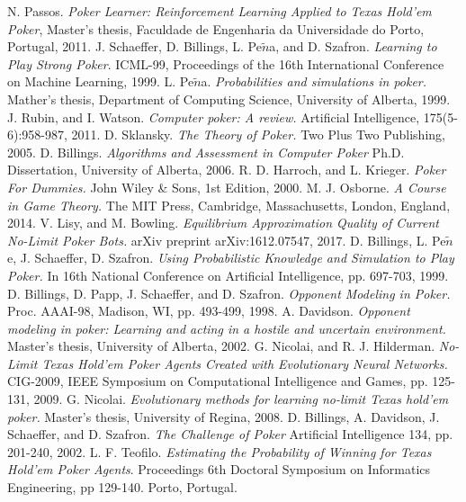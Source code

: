 
\begin{thebibliography}{9}
  N. Passos.
  \textit{Poker Learner: Reinforcement Learning Applied to Texas Hold'em Poker},
  Master's thesis, Faculdade de Engenharia da Universidade do Porto, Portugal, 
  2011.
  \href{https://paginas.fe.up.pt/$\sim$ei08029/Master\%20Thesis\%20-\%20Nuno\%20Passos.pdf}{}
   J. Schaeffer, D. Billings, L. Pe$\tilde{n}$a, and D. Szafron.
  \textit{Learning to Play Strong Poker}.
  ICML-99, Proceedings of the 16th International Conference on Machine Learning, 
  1999.
  \href{http://poker.cs.ualberta.ca/publications/ICML99.pdf}{}
  L. Pe$\tilde{n}$a.
  \textit{Probabilities and simulations in poker.}
  Mather's thesis, Department of Computing Science, University of Alberta,
  1999.
  J. Rubin, and I. Watson.
  \textit{Computer poker: A review.}
   Artificial Intelligence, 175(5-6):958-987,
  2011.
  D. Sklansky.
  \textit{The Theory of Poker.}
   Two Plus Two Publishing,
  2005.
  D. Billings.
  \textit{Algorithms and Assessment in Computer Poker}
   Ph.D. Dissertation, University of Alberta,
  2006.
  R. D. Harroch, and L. Krieger.
  \textit{Poker For Dummies.}
   John Wiley \& Sons, 1st Edition,
  2000.
  M. J. Osborne.
  \textit{A Course in Game Theory.}
   The MIT Press, Cambridge, Massachusetts, London, England,
  2014.
  V. Lisy, and M. Bowling.
  \textit{Equilibrium Approximation Quality of Current No-Limit Poker Bots.}
   arXiv preprint arXiv:1612.07547,
  2017.
  D. Billings, L. Pe$\tilde{n}$e, J. Schaeffer, D. Szafron.
  \textit{Using Probabilistic Knowledge and Simulation to Play Poker.}
   In 16th National Conference on Artificial
Intelligence, pp. 697-703,
  1999.
  D. Billings, D. Papp, J. Schaeffer, and D. Szafron.
  \textit{Opponent Modeling in Poker.}
   Proc. AAAI-98, Madison, WI, pp. 493-499,
  1998.
  A. Davidson.
  \textit{Opponent modeling in poker: Learning and acting in a hostile and uncertain environment.}
   Master’s thesis, University of Alberta, 
  2002.
G. Nicolai, and R. J. Hilderman.
\textit{No-Limit Texas Hold'em Poker Agents Created with Evolutionary Neural Networks.}
CIG-2009, IEEE Symposium on Computational Intelligence and Games, pp. 125-131, 2009.
G. Nicolai.
\textit{Evolutionary methods for learning no-limit Texas hold'em poker.} Master's thesis, University of Regina, 2008.
D. Billings, A. Davidson, J. Schaeffer, and D. Szafron.
\textit{The Challenge of Poker}
Artificial Intelligence 134, pp. 201-240, 2002.
L. F. Teofilo.
\textit{Estimating the Probability of Winning for Texas Hold'em Poker Agents}.
Proceedings 6th Doctoral Symposium on Informatics Engineering, pp 129-140. Porto, Portugal.
\end{thebibliography}


